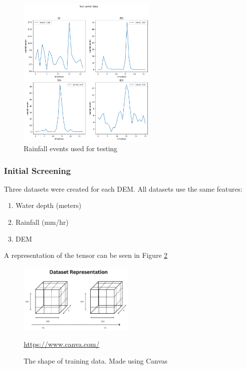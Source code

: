 \begin{figure}[htbp]
	\includegraphics[width=0.6\textwidth]{../Figures/test_rainfall_events.png}
	\centering
	\caption[Rainfall Test]{Rainfall events used for testing} 
	\label{fig:4.4}
\end{figure}

\subsubsection*{Initial Screening}
\label{methods:inital-screening}
Three datasets were created for each DEM. All datasets use the same features:
\begin{enumerate}
	\item Water depth (meters)
	\item Rainfall (mm/hr)
	\item DEM
\end{enumerate}

A representation of the tensor can be seen in Figure \ref{fig:4.5} \\

\begin{figure}[htbp]
	\includegraphics[width=0.5\textwidth]{../Figures/dataset_visualization}
	\centering
	\caption[training data]{The shape of training data. Made using Canvas}
	\url{https://www.canva.com/}
	\label{fig:4.5}
\end{figure}

